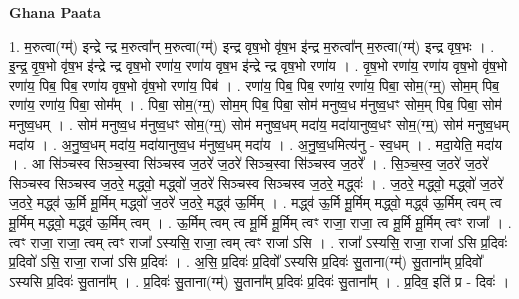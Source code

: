\documentclass[17pt]{extarticle}
\begin{document}
\textbf{Ghana Paata } \newline

1. म॒रुत्वा(ग्म्॑) इन्द्रे न्द्र म॒रुत्वा᳚न् म॒रुत्वा(ग्म्॑) इन्द्र वृष॒भो वृ॑ष॒भ इ॑न्द्र म॒रुत्वा᳚न् म॒रुत्वा(ग्म्॑) इन्द्र वृष॒भः । . इ॒न्द्र॒ वृ॒ष॒भो वृ॑ष॒भ इ॑न्द्रे न्द्र वृष॒भो रणा॑य॒ रणा॑य वृष॒भ इ॑न्द्रे न्द्र वृष॒भो रणा॑य । . वृ॒ष॒भो रणा॑य॒ रणा॑य वृष॒भो वृ॑ष॒भो रणा॑य॒ पिब॒ पिब॒ रणा॑य वृष॒भो वृ॑ष॒भो रणा॑य॒ पिब॑ । . रणा॑य॒ पिब॒ पिब॒ रणा॑य॒ रणा॑य॒ पिबा॒ सोम॒(ग्म्॒) सोम॒म् पिब॒ रणा॑य॒ रणा॑य॒ पिबा॒ सोम᳚म् । . पिबा॒ सोम॒(ग्म्॒) सोम॒म् पिब॒ पिबा॒ सोम॑ मनुष्व॒ध म॑नुष्व॒धꣳ सोम॒म् पिब॒ पिबा॒ सोम॑ मनुष्व॒धम् । . सोम॑ मनुष्व॒ध म॑नुष्व॒धꣳ सोम॒(ग्म्॒) सोम॑ मनुष्व॒धम् मदा॑य॒ मदा॑यानुष्व॒धꣳ सोम॒(ग्म्॒) सोम॑ मनुष्व॒धम् मदा॑य । . अ॒नु॒ष्व॒धम् मदा॑य॒ मदा॑यानुष्व॒ध म॑नुष्व॒धम् मदा॑य । . अ॒नु॒ष्व॒धमित्य॑नु - स्व॒धम् । . मदा॒येति॒ मदा॑य । . आ सि॑ञ्चस्व सिञ्च॒स्वा सि॑ञ्चस्व ज॒ठरे॑ ज॒ठरे॑ सिञ्च॒स्वा सि॑ञ्चस्व ज॒ठरे᳚ । . सि॒ञ्च॒स्व॒ ज॒ठरे॑ ज॒ठरे॑ सिञ्चस्व सिञ्चस्व ज॒ठरे॒ मद्ध्वो॒ मद्ध्वो॑ ज॒ठरे॑ सिञ्चस्व सिञ्चस्व ज॒ठरे॒ मद्ध्वः॑ । . ज॒ठरे॒ मद्ध्वो॒ मद्ध्वो॑ ज॒ठरे॑ ज॒ठरे॒ मद्ध्व॑ ऊ॒र्मि मू॒र्मिम् मद्ध्वो॑ ज॒ठरे॑ ज॒ठरे॒ मद्ध्व॑ ऊ॒र्मिम् । . मद्ध्व॑ ऊ॒र्मि मू॒र्मिम् मद्ध्वो॒ मद्ध्व॑ ऊ॒र्मिम् त्वम् त्व मू॒र्मिम् मद्ध्वो॒ मद्ध्व॑ ऊ॒र्मिम् त्वम् । . ऊ॒र्मिम् त्वम् त्व मू॒र्मि मू॒र्मिम् त्वꣳ राजा॒ राजा॒ त्व मू॒र्मि मू॒र्मिम् त्वꣳ राजा᳚ । . त्वꣳ राजा॒ राजा॒ त्वम् त्वꣳ राजा᳚ ऽस्यसि॒ राजा॒ त्वम् त्वꣳ राजा॑ ऽसि । . राजा᳚ ऽस्यसि॒ राजा॒ राजा॑ ऽसि प्र॒दिवः॑ प्र॒दिवो॑ ऽसि॒ राजा॒ राजा॑ ऽसि प्र॒दिवः॑ । . अ॒सि॒ प्र॒दिवः॑ प्र॒दिवो᳚ ऽस्यसि प्र॒दिवः॑ सु॒ताना(ग्म्॑) सु॒ताना᳚म् प्र॒दिवो᳚ ऽस्यसि प्र॒दिवः॑ सु॒ताना᳚म् । . प्र॒दिवः॑ सु॒ताना(ग्म्॑) सु॒ताना᳚म् प्र॒दिवः॑ प्र॒दिवः॑ सु॒ताना᳚म् । . प्र॒दिव॒ इति॑ प्र - दिवः॑ । \newline
\end{document}
